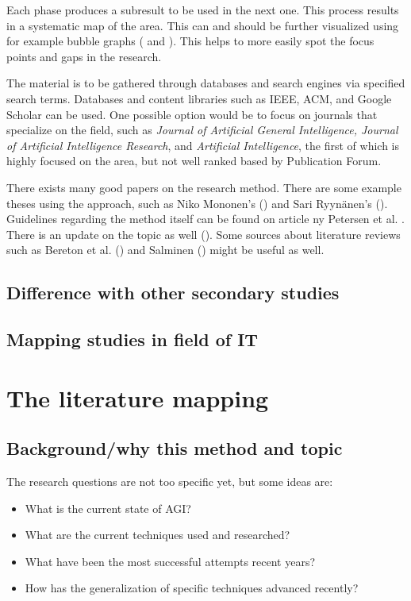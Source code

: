 \documentclass[utf8,english]{gradu3}
\begin{document}
Each phase produces a subresult to be used in the next one. This process results in a systematic map of the area. This can and should be further visualized using for example bubble graphs (\cite{mononen2018} and \cite{petersen2008}). This helps to more easily spot the focus points and gaps in the research.


The material is to be gathered through databases and search engines via specified search terms. Databases and content libraries such as IEEE, ACM, and Google Scholar can be used. One possible option would be to focus on journals that specialize on the field, such as \textit{Journal of Artificial General Intelligence, Journal of Artificial Intelligence Research}, and \textit{Artificial Intelligence}, the first of which is highly focused on the area, but not well ranked based by Publication Forum. 

There exists many good papers on the research method. There are some example theses using the approach, such as Niko Mononen's (\cite{mononen2018}) and Sari Ryynänen's (\cite{ryynanen2017}). Guidelines regarding the method itself can be found on article ny Petersen et al. \cite*{petersen2008}. There is an update on the topic as well (\cite{petersen2015}). Some sources about literature reviews such as Bereton et al. (\cite*{brereton2007}) and Salminen (\cite*{salminen2011}) might be useful as well.

\section{Difference with other secondary studies}

\section{Mapping studies in field of IT}

\chapter{The literature mapping}

\section{Background/why this method and topic}
The research questions are not too specific yet, but some ideas are:
\begin{itemize}
    \item What is the current state of AGI?
    \item What are the current techniques used and researched?
    \item What have been the most successful attempts recent years?
    \item How has the generalization of specific techniques advanced recently?
\end{itemize}
\end{document}
